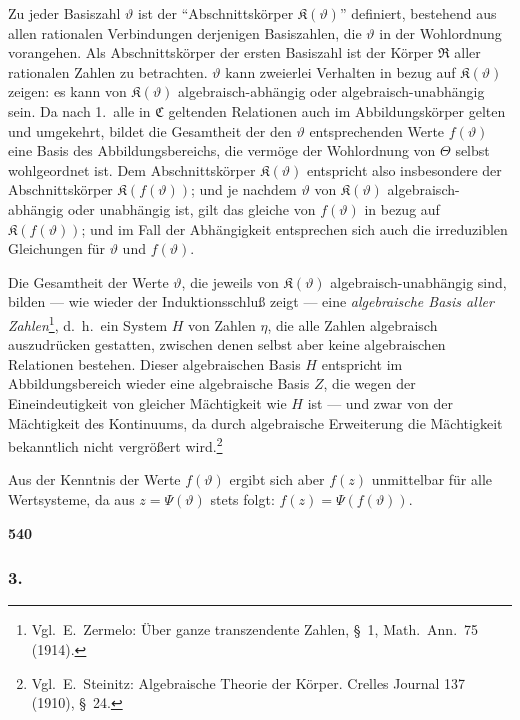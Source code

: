 \documentclass[12pt,a4paper]{article}
\begin{document}
Zu jeder Basiszahl $\vartheta$ ist der ``Abschnittsk\"orper $\mathfrak{K}(\vartheta)$'' definiert, bestehend aus allen rationalen Verbindungen derjenigen Basiszahlen, die $\vartheta$ in der Wohlordnung vorangehen. Als Abschnittsk\"orper der ersten Basiszahl ist der K\"orper $\mathfrak{R}$ aller rationalen Zahlen zu betrachten. $\vartheta$ kann zweierlei Verhalten in bezug auf $\mathfrak{K}(\vartheta)$ zeigen: es kann von $\mathfrak{K}(\vartheta)$ algebraisch-abh\"angig oder algebraisch-unabh\"angig sein. Da nach 1.\ alle in $\mathfrak{C}$ geltenden Relationen auch im Abbildungsk\"orper gelten und umgekehrt, bildet die Gesamtheit der den $\vartheta$ entsprechenden Werte $f(\vartheta)$ eine Basis des Abbildungsbereichs, die verm\"oge der Wohlordnung von $\Theta$ selbst wohlgeordnet ist. Dem Abschnittsk\"orper $\mathfrak{K}(\vartheta)$ entspricht also insbesondere der Abschnittsk\"orper $\mathfrak{K}(f(\vartheta))$; und je nachdem $\vartheta$ von $\mathfrak{K}(\vartheta)$ algebraisch-abh\"angig oder unabh\"angig ist, gilt das gleiche von $f(\vartheta)$ in bezug auf $\mathfrak{K}(f(\vartheta))$; und im Fall der Abh\"angigkeit entsprechen sich auch die irreduziblen Gleichungen f\"ur $\vartheta$ und $f(\vartheta)$.

Die Gesamtheit der Werte $\vartheta$, die jeweils von $\mathfrak{K}(\vartheta)$ algebraisch-unabh\"angig sind, bilden --- wie wieder der Induktionsschlu\ss{} zeigt --- eine \emph{algebraische Basis aller Zahlen}\footnote{Vgl.\ E.\ Zermelo: \"Uber ganze transzendente Zahlen, \S\ 1, Math.\ Ann.\ 75 (1914).}, d.\ h.\ ein System $H$ von Zahlen $\eta$, die alle Zahlen algebraisch auszudr\"ucken gestatten, zwischen denen selbst aber keine algebraischen Relationen bestehen. Dieser algebraischen Basis $H$ entspricht im Abbildungsbereich wieder eine algebraische Basis $Z$, die wegen der Eineindeutigkeit von gleicher M\"achtigkeit wie $H$ ist --- und zwar von der M\"achtigkeit des Kontinuums, da durch algebraische Erweiterung die M\"achtigkeit bekanntlich nicht vergr\"o\ss ert wird.\footnote{Vgl.\ E.\ Steinitz: Algebraische Theorie der K\"orper. Crelles Journal 137 (1910), \S\ 24.}

Aus der Kenntnis der Werte $f(\vartheta)$ ergibt sich aber $f(z)$ unmittelbar f\"ur alle Wertsysteme, da aus $z = \Psi(\vartheta)$ stets folgt: $f(z) = \Psi(f(\vartheta))$.

\newpage
\begin{center}
\textbf{540}
\end{center}

\subsubsection*{3.}
\end{document}
